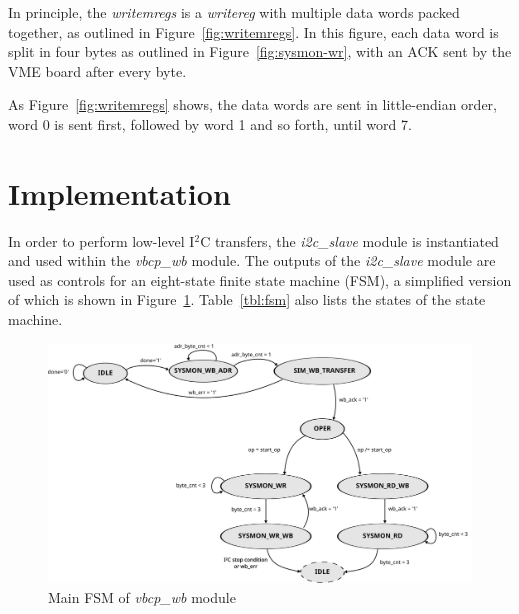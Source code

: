 \documentclass[a4paper,11pt]{article}
\begin{document}
In principle, the \textit{writemregs} is a \textit{writereg} with multiple data words
packed together, as outlined in Figure~\ref{fig:writemregs}. In this figure, each data word
is split in four bytes as outlined in Figure~\ref{fig:sysmon-wr}, with an ACK sent by
the VME board after every byte.

As Figure~\ref{fig:writemregs} shows, the data words are sent in little-endian order,
word 0 is sent first, followed by word 1 and so forth, until word 7.

\section{Implementation}
\label{sec:implem}

In order to perform low-level I$^2$C transfers, the \textit{i2c\_slave} module
is instantiated and used within the \textit{vbcp\_wb}
module. The outputs of the \textit{i2c\_slave} module  are used as controls
for an eight-state  finite state machine (FSM), a simplified version of which 
is shown in Figure~\ref{fig:fsm}. Table~\ref{tbl:fsm} also lists the states of 
the state machine.

\begin{figure}[h]
  \centerline{\includegraphics[scale=.65]{fig/fsm}}
  \caption{Main FSM of \textit{vbcp\_wb} module}
  \label{fig:fsm}
\end{figure}
\end{document}
